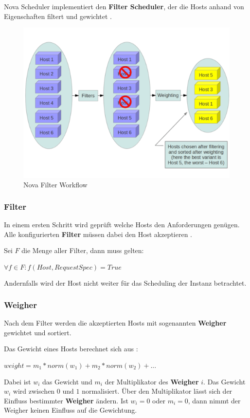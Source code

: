 \documentclass[../Main.tex]{subfiles}
\begin{document}
Nova Scheduler implementiert den \textbf{Filter Scheduler}, der die Hosts anhand von Eigenschaften filtert
und gewichtet \citep{ComputeSchedulers}.
\begin{figure}[h]
    \centering
    \includegraphics[width=0.9\columnwidth]{Images/NovaFilterWorkflow.png}
    \caption{Nova Filter Workflow \citep{ComputeSchedulers}}
\end{figure}

\subsubsection{Filter}

In einem ersten Schritt wird geprüft welche Hosts den Anforderungen
genügen. Alle konfigurierten \textbf{Filter} müssen dabei den Host akzeptieren \citep{ComputeSchedulers}.

Sei $F$ die Menge aller Filter, dann muss gelten:

\begin{center}
    $\forall f \in F: f(Host, RequestSpec) = True$
\end{center}

Andernfalls wird der Host nicht weiter
für das Scheduling der Instanz betrachtet.

\subsubsection{Weigher}
\label{chapter:Weigher}

Nach dem Filter werden die akzeptierten Hosts mit sogenannten \textbf{Weigher} gewichtet und sortiert.

Das Gewicht eines Hosts berechnet sich aus \citep{NormalizedWeights}:
\begin{center}
    $weight = m_1 * norm(w_1) + m_2 * norm(w_2) + ...$
\end{center}
Dabei ist $w_i$ das Gewicht und $m_i$ der Multiplikator des \textbf{Weigher} $i$. Das Gewicht
$w_i$ wird zwischen $0$ und $1$ normalisiert. Über den Multiplikator lässt sich der Einfluss
bestimmter \textbf{Weigher} ändern. Ist $w_i = 0$ oder $m_i= 0$, dann nimmt der Weigher keinen Einfluss
auf die Gewichtung.
\end{document}
